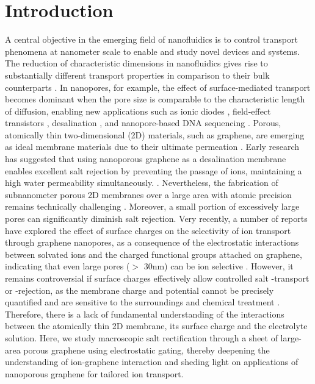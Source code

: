 \documentclass[journal=langd5,email=true, hyperref=true, keywords=false]{achemso}
\begin{document}
\section{Introduction}
\label{sec:intro}
A central objective in the emerging field of nanofluidics is to
control transport phenomena at nanometer scale to enable and study
novel devices and systems. The reduction of characteristic dimensions
in nanofluidics gives rise to substantially different transport
properties in comparison to their bulk counterparts
\cite{Schoch_2008}. In nanopores, for example, the effect of
surface-mediated transport becomes dominant when the pore size is
comparable to the characteristic length of diffusion, enabling new
applications such as ionic diodes \cite{Karnik_2007}, field-effect
transistors \cite{Nam_2009}, desalination \cite{Heiranian_2015}, and
nanopore-based DNA sequencing \cite{Heerema_2016,Garaj_2013}. Porous,
atomically thin two-dimensional (2D) materials, such as graphene, are
emerging as ideal membrane materials due to their ultimate permeation
\cite{Suk_2010,Jiang_2009,Celebi_2014,Koenig_2012,Drahushuk_2012}. Early
research has suggested that using nanoporous graphene as a
desalination membrane enables excellent salt rejection by preventing
the passage of ions, maintaining a high water permeability
simultaneously.
\cite{Cohen_Tanugi_2012,Suk_2014,Cohen_Tanugi_2014,Cohen_Tanugi_2015,O_Hern_2014,O_Hern_2015,Surwade_2015,Walker_2017,Ghosh_2018}. Nevertheless,
the fabrication of subnanometer porous 2D membranes over a large area
with atomic precision remains technically challenging
\cite{Suk_2014,Rollings_2016,O_Hern_2012,Wang_2017}. Moreover, a small
portion of excessively large pores can significantly diminish salt
rejection.  Very recently, a number of reports have explored the
effect of surface charges on the selectivity of ion transport through
graphene nanopores, as a consequence of the electrostatic interactions
between solvated ions and the charged functional groups attached on
graphene, indicating that even large pores ($>$ 30nm) can be ion
selective \cite{Rollings_2016,Surwade_2014}. However, it remains
controversial if surface charges effectively allow controlled salt
-transport or -rejection, as the membrane charge and potential cannot
be precisely quantified and are sensitive to the surroundings and
chemical treatment \cite{Li_2008}. Therefore, there is a lack of
fundamental understanding of the interactions between the atomically
thin 2D membrane, its surface charge and the electrolyte
solution. Here, we study macroscopic salt rectification through a
sheet of large-area porous graphene using electrostatic gating,
thereby deepening the understanding of ion-graphene interaction and
sheding light on applications of nanoporous graphene for tailored ion
transport.
\end{document}
